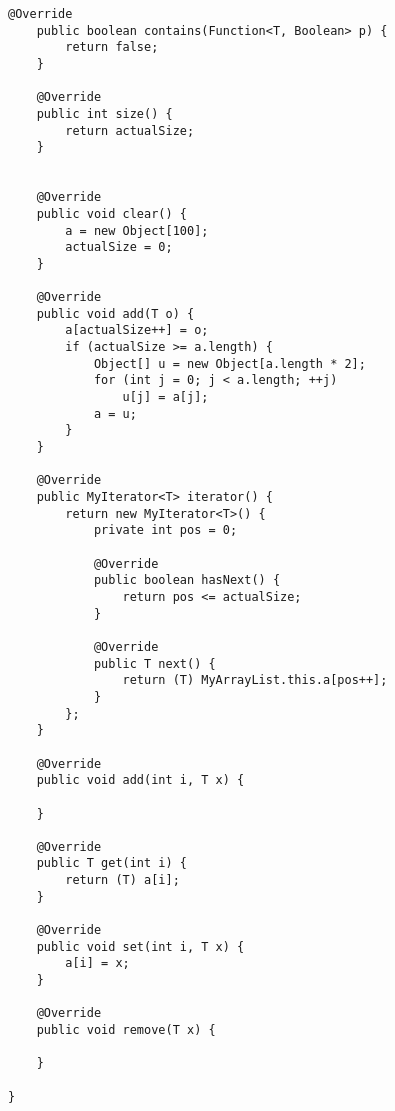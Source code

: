 \begin{lstlisting}[basicstyle=\small,]
    @Override
    public boolean contains(Function<T, Boolean> p) {
        return false;
    }

    @Override
    public int size() {
        return actualSize;
    }


    @Override
    public void clear() {
        a = new Object[100];
        actualSize = 0;
    }

    @Override
    public void add(T o) {
        a[actualSize++] = o;
        if (actualSize >= a.length) {
            Object[] u = new Object[a.length * 2];
            for (int j = 0; j < a.length; ++j)
                u[j] = a[j];
            a = u;
        }
    }

    @Override
    public MyIterator<T> iterator() {
        return new MyIterator<T>() {
            private int pos = 0;

            @Override
            public boolean hasNext() {
                return pos <= actualSize;
            }

            @Override
            public T next() {
                return (T) MyArrayList.this.a[pos++];
            }
        };
    }

    @Override
    public void add(int i, T x) {

    }

    @Override
    public T get(int i) {
        return (T) a[i];
    }

    @Override
    public void set(int i, T x) {
        a[i] = x;
    }

    @Override
    public void remove(T x) {

    }

}

\end{lstlisting}

